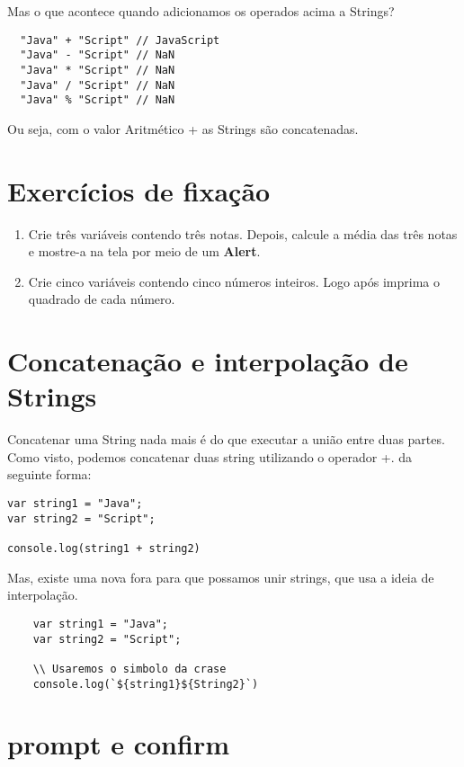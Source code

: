 Mas o que acontece quando adicionamos os operados acima a Strings? 

\begin{lstlisting}
  "Java" + "Script" // JavaScript 
  "Java" - "Script" // NaN
  "Java" * "Script" // NaN
  "Java" / "Script" // NaN
  "Java" % "Script" // NaN
\end{lstlisting}

Ou seja, com o valor Aritmético + as Strings são concatenadas.

\section{Exercícios de fixação}

\begin{enumerate}
	\item Crie três variáveis contendo três notas. Depois, calcule a média das três notas e mostre-a na tela por meio de um \textbf{Alert}.  
	\item Crie cinco variáveis contendo cinco números inteiros. Logo após imprima o quadrado de cada número.
\end{enumerate}

\section{Concatenação e interpolação de Strings}

Concatenar uma String nada mais é do que executar a união entre duas partes. Como visto, podemos concatenar duas string utilizando o operador +. da seguinte forma:

\begin{lstlisting}
var string1 = "Java";
var string2 = "Script";

console.log(string1 + string2)
\end{lstlisting}

Mas, existe uma nova fora para que possamos unir strings, que usa a ideia de interpolação.

\begin{lstlisting}
	var string1 = "Java";
	var string2 = "Script";
	
	\\ Usaremos o simbolo da crase
	console.log(`${string1}${String2}`)
\end{lstlisting}

\section{prompt e confirm}

